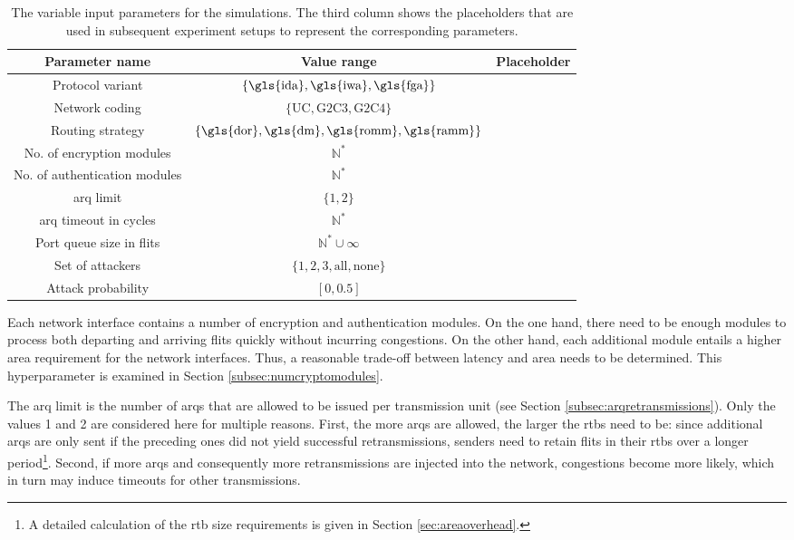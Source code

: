 \begin{table}
    \centering
    \begin{tabulary}{\textwidth}{C|C|C}
        Parameter name & Value range & Placeholder \\\hline
        Protocol variant & $\{\text{\gls{ida}}, \text{\gls{iwa}}, \text{\gls{fga}}\}$ & \pProtVar{} \\
        Network coding & $\{\text{UC}, \text{G2C3}, \text{G2C4}\}$ & \pNCMode{} \\
        Routing strategy & $\{\text{\gls{dor}}, \text{\gls{dm}}, \text{\gls{romm}}, \text{\gls{ramm}}\}$ & \pRStrat{} \\
        No. of encryption modules & $\mathbb{N}^*$ & \pEncMods{} \\
        No. of authentication modules & $\mathbb{N}^*$ & \pAuthMods{} \\
        \Gls{arq} limit & $\{1, 2\}$ & \pARQLimit{} \\
        \Gls{arq} timeout in cycles & $\mathbb{N}^*$ & \pARQTimeout{} \\
        Port queue size in flits & $\mathbb{N}^* \cup \infty$ & \pRQSize{} \\
        Set of attackers & $\{1, 2, 3, \text{all}, \text{none}\}$ & \pAttackerSet{} \\
        Attack probability & $[0, 0.5]$ & \pAttackProb{} \\
    \end{tabulary}
    \caption[Variable input parameters for the simulations]{The variable input parameters for the simulations. The third column shows the placeholders
    that are used in subsequent experiment setups to represent the corresponding parameters.}
    \label{tab:inputparams}
\end{table}

Each network interface contains a number of encryption and authentication modules. On the one hand, there need to be enough modules to process both
departing and arriving flits quickly without incurring congestions. On the other hand, each additional module entails a higher area requirement for
the network interfaces. Thus, a reasonable trade-off between latency and area needs to be determined. This hyperparameter is examined in Section
\ref{subsec:numcryptomodules}.

The \gls{arq} limit is the number of \glspl{arq} that are allowed to be issued per transmission unit (see Section \ref{subsec:arqretransmissions}).
Only the values 1 and 2 are considered here for multiple reasons. First, the more \glspl{arq} are allowed, the larger the \glspl{rtb} need to be:
since additional \glspl{arq} are only sent if the preceding ones did not yield successful retransmissions, senders need to retain flits in their
\glspl{rtb} over a longer period\footnote{A detailed calculation of the \gls{rtb} size requirements is given in Section \ref{sec:areaoverhead}.}.
Second, if more \glspl{arq} and consequently more retransmissions are injected into the network, congestions become more likely, which in turn may
induce timeouts for other transmissions.

